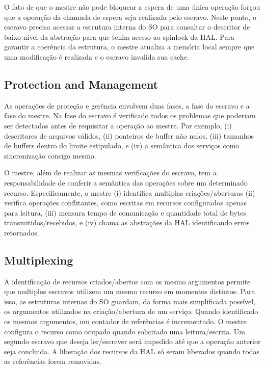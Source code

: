 			O fato de que o mestre não pode bloquear a espera de uma única operação forçou que a operação da chamada de espera seja realizada pelo escravo.
			Neste ponto, o escravo precisa acessar a estrutura interna do SO para consultar o descritor de baixo nível da abstração para que tenha acesso ao spinlock da HAL.
			Para garantir a coerência da estrutura, o mestre atualiza a memória local sempre que uma modificação é realizada e o escravo invalida sua cache.

		\subsection{Protection and Management}

			As operações de proteção e gerência envolvem duas fases, a fase do escravo e a fase do mestre.
			Na fase do escravo é verificado todos os problemas que poderiam ser detectados antes de requisitar a operação ao mestre.
			Por exemplo,
			(i) descritores de arquivos válidos,
			(ii) ponteiros de buffer não nulos,
			(iii) tamanhos de buffers dentro do limite estipulado, e
			(iv) a semântica dos serviços como sincronização consigo mesmo.
			
			O mestre, além de realizar as mesmas verificações do escravo, tem a responsabilidade de conferir a semântica das operações sobre um determinado recurso.
			Especificamente, o mestre
			(i) identifica multiplas criações/aberturas
			(ii) verifica operações conflitantes, como escritas em recursos configurados apenas para leitura,
			(iii) mensura tempo de comunicação e quantidade total de bytes transmitidos/recebidos, e
			(iv) chama as abstrações da HAL identificando erros retornados.

		\subsection{Multiplexing}

			A identificação de recursos criados/abertos com os mesmo argumentos permite que multiplos escravos utilizem um mesmo recurso em momentos distintos.
			Para isso, as estruturas internas do SO guardam, da forma mais simplificada possível, os argumentos utilizados na criação/abertura de um serviço.
			Quando identificado os mesmos argumentos, um contador de referências é incrementado.
			O mestre configura o recurso como ocupado quando solicitado uma leitura/escrita.
			Um segundo escravo que deseja ler/escrever será impedido até que a operação anterior seja concluida.
			A liberação dos recursos da HAL só seram liberados quando todas as referências forem removidas.

